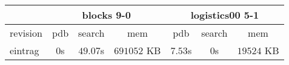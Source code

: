 \documentclass[a4paper,12pt]{scrartcl}
\begin{document}

\begin{tabular}{|l|c|c|c|c|c|c|}\hline
& \multicolumn{3}{c|}{blocks 9-0} & \multicolumn{3}{c|}{logistics00 5-1}\\\hline
revision & pdb & search & mem & pdb & search & mem\\\hline
eintrag & $0$s & $49.07$s & $691052$ KB & $7.53$s & $0$s & $19524$ KB\\\hline
\end{tabular}
\end{document}
